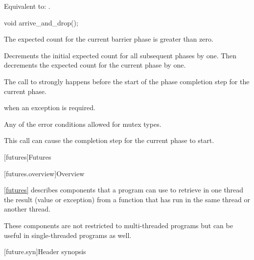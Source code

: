 \begin{itemdescr}
\pnum
\effects
Equivalent to: .
\end{itemdescr}

%
\begin{itemdecl}
void arrive_and_drop();
\end{itemdecl}

\begin{itemdescr}
\pnum
\expects
The expected count for the current barrier phase is greater than zero.

\pnum
\effects
Decrements the initial expected count for all subsequent phases by one.
Then decrements the expected count for the current phase by one.

\pnum
\sync
The call to  strongly happens before
the start of the phase completion step for the current phase.

\pnum
\throws
{} when an exception is required.

\pnum
\errors
Any of the error conditions
allowed for mutex types.

\pnum
\begin{note}
This call can cause the completion step for the current phase to start.
\end{note}
\end{itemdescr}

[futures]{Futures}

[futures.overview]{Overview}

\pnum
\ref{futures} describes components that a \Cpp{} program can use to retrieve in one thread the
result (value or exception) from a function that has run in the same thread or another thread.
\begin{note} These components are not restricted to multi-threaded programs but can be useful in
single-threaded programs as well. \end{note}

[future.syn]{Header  synopsis}

